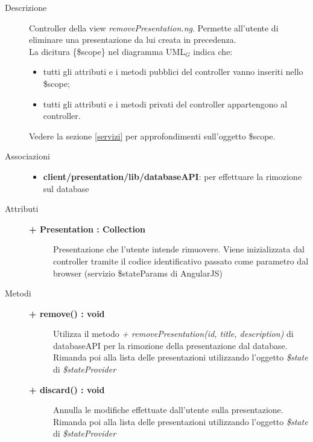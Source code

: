 \begin{description}
\item[Descrizione] \hfill
	Controller della view \textit{removePresentation.ng}. Permette all'utente di eliminare una presentazione da lui creata in precedenza.
	\\ La dicitura \{\$scope\} nel diagramma UML$_G$ indica che:
\begin{itemize}
\item tutti gli attributi e i metodi pubblici del controller vanno inseriti nello \$scope;
\item tutti gli attributi e i metodi privati del controller appartengono al controller.
\end{itemize}
Vedere la sezione \ref{servizi} per approfondimenti sull'oggetto \$scope.
	

\item[Associazioni] \hfill
	\begin{itemize}
		\item \textbf{client/presentation/lib/databaseAPI}: per effettuare la rimozione sul database
	\end{itemize}

	
\item[Attributi] \hfill
	\begin{description}
		\item[\textbf{+ Presentation : Collection			}] \hfill
			Presentazione che l'utente intende rimuovere. Viene inizializzata dal controller tramite il codice identificativo passato come parametro dal browser (servizio \$stateParams di AngularJS)
	\end{description}
	
	
\item[Metodi] \hfill

	\begin{description}
		\item[\textbf{\color{blue}+ remove() : void			}] \hfill
			Utilizza il metodo \textit{+ removePresentation(id, title, description)} di databaseAPI per la rimozione della presentazione dal database. Rimanda poi alla lista delle presentazioni utilizzando l'oggetto \textit{\$state} di \textit{\$stateProvider}
	\end{description}
	
	\begin{description}
		\item[\textbf{\color{blue}+ discard() : void			}] \hfill
			Annulla le modifiche effettuate dall'utente sulla presentazione. Rimanda poi alla lista delle presentazioni utilizzando l'oggetto \textit{\$state} di \textit{\$stateProvider}
	\end{description}
	
	
	
\end{description}















